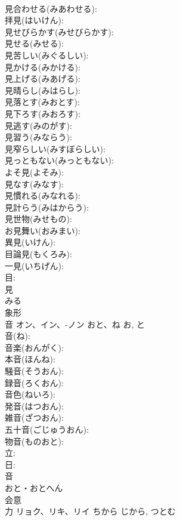 \documentclass[8pt]{extreport}
\begin{document}
\begin{CJK}{UTF8}{min}
\\	見合わせる(みあわせる): 
\\	拝見(はいけん): 
\\	見せびらかす(みせびらかす): 
\\	見せる(みせる): 
\\	見苦しい(みぐるしい): 
\\	見かける(みかける): 
\\	見上げる(みあげる): 
\\	見晴らし(みはらし): 
\\	見落とす(みおとす): 
\\	見下ろす(みおろす): 
\\	見逃す(みのがす): 
\\	見習う(みならう): 
\\	見窄らしい(みすぼらしい): 
\\	見っともない(みっともない): 
\\	よそ見(よそみ): 
\\	見なす(みなす): 
\\	見慣れる(みなれる): 
\\	見計らう(みはからう): 
\\	見世物(みせもの): 
\\	お見舞い(おみまい): 
\\	異見(いけん): 
\\	目論見(もくろみ): 
\\	一見(いちげん): 
\\	目: 
\\	見	
\\	みる	
\\	象形 
\\	音	オン、イン、-ノン	おと、ね	お, と	
\\	音(ね): 
\\	音楽(おんがく): 
\\	本音(ほんね): 
\\	騒音(そうおん): 
\\	録音(ろくおん): 
\\	音色(ねいろ): 
\\	発音(はつおん): 
\\	雑音(ざつおん): 
\\	五十音(ごじゅうおん): 
\\	物音(ものおと): 
\\	立: 
\\	日: 
\\	音	
\\	おと・おとへん	
\\	会意 
\\	力	リョク、リキ、リイ	ちから	じから, つとむ	

\end{CJK}
\end{document}
